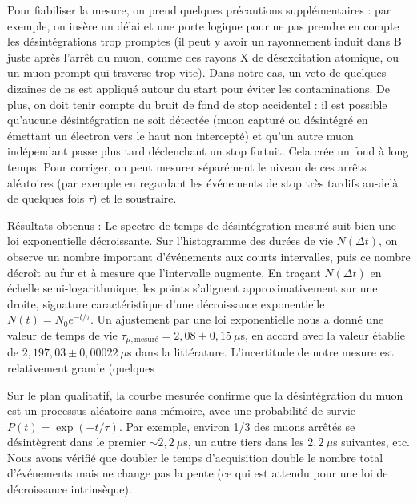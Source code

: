 \documentclass[a4paper,12pt,twoside]{article}
\begin{document}
Pour fiabiliser la mesure, on prend quelques précautions supplémentaires : par exemple, on insère un délai et une porte logique pour ne pas prendre en compte les désintégrations trop promptes (il peut y avoir un rayonnement induit dans B juste après l’arrêt du muon, comme des rayons X de désexcitation atomique, ou un muon prompt qui traverse trop vite). Dans notre cas, un veto de quelques dizaines de ns est appliqué autour du start pour éviter les contaminations. De plus, on doit tenir compte du bruit de fond de stop accidentel : il est possible qu’aucune désintégration ne soit détectée (muon capturé ou désintégré en émettant un électron vers le haut non intercepté) et qu’un autre muon indépendant passe plus tard déclenchant un stop fortuit. Cela crée un fond à long temps. Pour corriger, on peut mesurer séparément le niveau de ces arrêts aléatoires (par exemple en regardant les événements de stop très tardifs au-delà de quelques fois $\tau$) et le soustraire.

Résultats obtenus : Le spectre de temps de désintégration mesuré suit bien une loi exponentielle décroissante. Sur l’histogramme des durées de vie $N(\Delta t)$, on observe un nombre important d’événements aux courts intervalles, puis ce nombre décroît au fur et à mesure que l’intervalle augmente. En traçant $N(\Delta t)$ en échelle semi-logarithmique, les points s’alignent approximativement sur une droite, signature caractéristique d’une décroissance exponentielle $N(t) = N_0 e^{-t/\tau}$. Un ajustement par une loi exponentielle nous a donné une valeur de temps de vie $\tau_{\mu,\text{mesuré}} = 2,08 \pm 0,15~\mu$s, en accord avec la valeur établie de $2,197,03 \pm 0,00022~\mu$s dans la littérature. L’incertitude de notre mesure est relativement grande (quelques %

Sur le plan qualitatif, la courbe mesurée confirme que la désintégration du muon est un processus aléatoire sans mémoire, avec une probabilité de survie $P(t) = \exp(-t/\tau)$. Par exemple, environ 1/3 des muons arrêtés se désintègrent dans le premier $\sim 2,2~\mu$s, un autre tiers dans les $2,2~\mu$s suivantes, etc. Nous avons vérifié que doubler le temps d’acquisition double le nombre total d’événements mais ne change pas la pente (ce qui est attendu pour une loi de décroissance intrinsèque).
\end{document}
